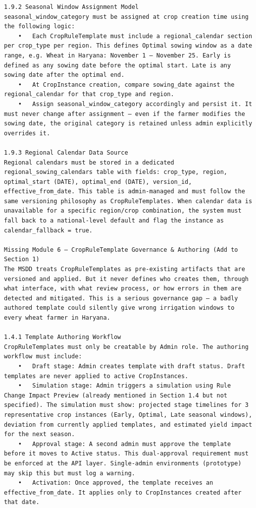 \documentclass{article}
\begin{document}
\begin{verbatim}
1.9.2 Seasonal Window Assignment Model
seasonal_window_category must be assigned at crop creation time using the following logic:
	•	Each CropRuleTemplate must include a regional_calendar section per crop_type per region. This defines Optimal sowing window as a date range, e.g. Wheat in Haryana: November 1 – November 25. Early is defined as any sowing date before the optimal start. Late is any sowing date after the optimal end.
	•	At CropInstance creation, compare sowing_date against the regional_calendar for that crop_type and region.
	•	Assign seasonal_window_category accordingly and persist it. It must never change after assignment — even if the farmer modifies the sowing date, the original category is retained unless admin explicitly overrides it.

1.9.3 Regional Calendar Data Source
Regional calendars must be stored in a dedicated regional_sowing_calendars table with fields: crop_type, region, optimal_start (DATE), optimal_end (DATE), version_id, effective_from_date. This table is admin-managed and must follow the same versioning philosophy as CropRuleTemplates. When calendar data is unavailable for a specific region/crop combination, the system must fall back to a national-level default and flag the instance as calendar_fallback = true.

Missing Module 6 — CropRuleTemplate Governance & Authoring (Add to Section 1)
The MSDD treats CropRuleTemplates as pre-existing artifacts that are versioned and applied. But it never defines who creates them, through what interface, with what review process, or how errors in them are detected and mitigated. This is a serious governance gap — a badly authored template could silently give wrong irrigation windows to every wheat farmer in Haryana.

1.4.1 Template Authoring Workflow
CropRuleTemplates must only be creatable by Admin role. The authoring workflow must include:
	•	Draft stage: Admin creates template with draft status. Draft templates are never applied to active CropInstances.
	•	Simulation stage: Admin triggers a simulation using Rule Change Impact Preview (already mentioned in Section 1.4 but not specified). The simulation must show: projected stage timelines for 3 representative crop instances (Early, Optimal, Late seasonal windows), deviation from currently applied templates, and estimated yield impact for the next season.
	•	Approval stage: A second admin must approve the template before it moves to Active status. This dual-approval requirement must be enforced at the API layer. Single-admin environments (prototype) may skip this but must log a warning.
	•	Activation: Once approved, the template receives an effective_from_date. It applies only to CropInstances created after that date.


\end{verbatim}
\end{document}
